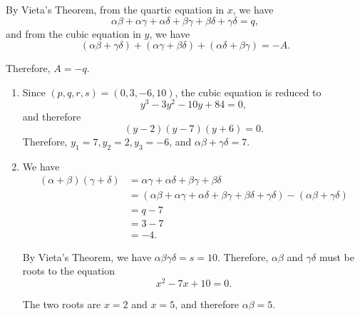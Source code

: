 \Question{\currfilebase}

By Vieta's Theorem, from the quartic equation in \(x\), we have
\[
    \alpha\beta + \alpha\gamma + \alpha\delta + \beta\gamma + \beta\delta + \gamma\delta = q,
\]
and from the cubic equation in \(y\), we have
\[
    \left(\alpha\beta + \gamma\delta\right) + \left(\alpha\gamma + \beta\delta\right) + \left(\alpha\delta + \beta\gamma\right) = -A.
\]

Therefore, \(A = -q\).

\begin{enumerate}
    \item Since \((p, q, r, s) = (0, 3, -6, 10)\), the cubic equation is reduced to
          \[
              y^3 - 3y^2 - 10y + 84 = 0,
          \]
          and therefore
          \[
              (y - 2)(y - 7)(y + 6) = 0.
          \]
          Therefore, \(y_1 = 7, y_2 = 2, y_3 = -6\), and \(\alpha\beta + \gamma\delta = 7\).

    \item We have
          \begin{align*}
              (\alpha + \beta)(\gamma + \delta) & = \alpha\gamma + \alpha\delta + \beta\gamma + \beta\delta                                                                                     \\
                                                & = \left(\alpha\beta + \alpha\gamma + \alpha\delta + \beta\gamma + \beta\delta + \gamma\delta\right) - \left(\alpha\beta + \gamma\delta\right) \\
                                                & = q - 7                                                                                                                                       \\
                                                & = 3 - 7                                                                                                                                       \\
                                                & = -4.
          \end{align*}

          By Vieta's Theorem, we have \(\alpha\beta\gamma\delta = s = 10\). Therefore, \(\alpha\beta\) and \(\gamma\delta\) must be roots to the equation
          \[
              x^2 - 7x + 10 = 0.
          \]

          The two roots are \(x = 2\) and \(x = 5\), and therefore \(\alpha\beta = 5\).


\end{enumerate}
